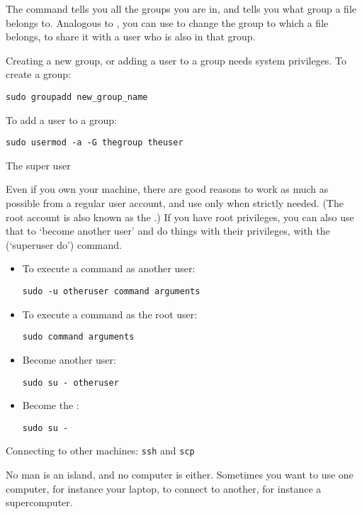 The command 
tells you all the groups you are in, and  tells you
what group a file belongs to. Analogous to ,
you can use  to change the group to
which a file belongs, to share it with a user who is also in that group.

Creating a new group, or
adding a user to a group needs system privileges.
To create a group:
\begin{lstlisting}
sudo groupadd new_group_name
\end{lstlisting}
To add a user to a group:
\begin{lstlisting}
sudo usermod -a -G thegroup theuser
\end{lstlisting}

 {The super user}

Even if you own your machine, there are good reasons to work as much
as possible from a regular user account, and use
 only when strictly needed.
%
(The root account is also known as the .)
%
If you have root privileges, you can also use that to `become another
user' and do things with their privileges, with the
 (`superuser do') command.

\begin{itemize}
\item To execute a command as another user:
\begin{lstlisting}
sudo -u otheruser command arguments
\end{lstlisting}
\item To execute a command as the root user:
\begin{lstlisting}
sudo command arguments
\end{lstlisting}
\item Become another user:
\begin{lstlisting}
sudo su - otheruser
\end{lstlisting}
\item Become the :
\begin{lstlisting}
sudo su -
\end{lstlisting}
\end{itemize}

 {Connecting to other machines: {\tt ssh} and {\tt scp}}

No man is an island, and no computer is either. Sometimes you want to
use one computer, for instance your laptop, to connect to another, for
instance a supercomputer.

